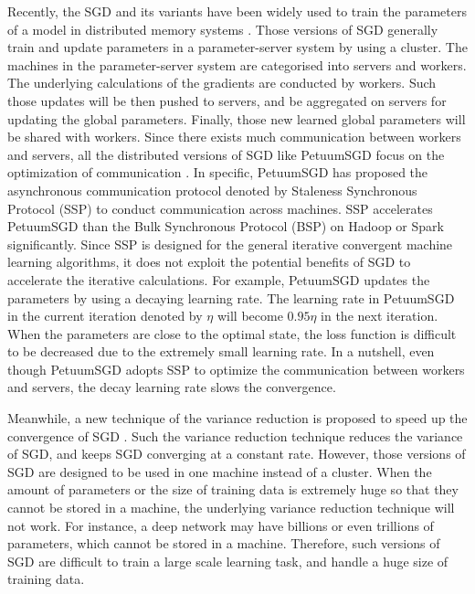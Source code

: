 \documentclass[10pt,journal,finalsubmission,compsoc]{IEEEtran}
\begin{document}
Recently, the SGD and its variants have been widely used to train the parameters of a model in distributed memory systems \cite{Dean:2012wx, Li:2014tt, Xing:2015ib}. Those versions of SGD generally train and update parameters in a parameter-server system by using a cluster. The machines in the parameter-server system are categorised into servers and workers. The underlying calculations of the gradients are conducted by workers. Such those updates will be then pushed to servers, and be aggregated on servers for updating the global parameters. Finally, those new learned global parameters will be shared with workers. Since there exists much communication between workers and servers, all the distributed versions of SGD like PetuumSGD focus on the optimization of communication \cite{Xing:2015ib}.  In specific, PetuumSGD has proposed the asynchronous communication protocol denoted by Staleness Synchronous Protocol (SSP) to conduct communication across machines. SSP  accelerates PetuumSGD than the Bulk Synchronous Protocol (BSP) on Hadoop or Spark significantly. Since SSP is designed for the general iterative convergent machine learning algorithms, it does not exploit the potential benefits of SGD to accelerate the iterative calculations. For example, PetuumSGD updates the parameters by using a decaying learning rate. The learning rate in PetuumSGD in the current iteration denoted by $\eta$ will become $0.95\eta$ in the next iteration. When the parameters are close to the optimal state, the loss function is difficult to be decreased due to the extremely small learning rate. In a nutshell,   even though PetuumSGD adopts SSP  to optimize the communication between workers and servers, the decay learning rate slows the convergence. 

Meanwhile, a new technique of the variance reduction is proposed to speed up the convergence of SGD \cite{Johnson:9MAvkbgy, Zhao:SZfxEHHg, Reddi:2015vj}. Such the variance reduction technique reduces the variance of SGD, and keeps SGD converging at a constant rate.   However, those versions of SGD are designed to be used in one machine instead of a cluster. When the amount of parameters or the size of training data is extremely huge so that they cannot be stored in a machine, the underlying variance reduction technique will not work. For instance, a deep network may have billions or even trillions of parameters, which cannot be stored in a machine. Therefore, such versions of SGD are difficult to train a large scale learning task, and handle a huge size of training data. 
\end{document}
